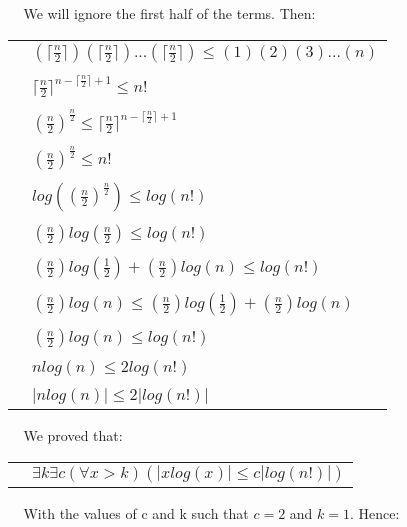\documentclass[11pt]{article}
\begin{document}
    \begin{flushleft}
        $\>\>\>\>\>$We will ignore the first half of the terms. Then: \\ 
    \end{flushleft}
    \begin{tabular}{l l}
        & $(\lceil \frac{n}{2} \rceil)(\lceil \frac{n}{2} \rceil)...(\lceil \frac{n}{2} \rceil) \leq (1)(2)(3)...(n)$ \\
        & \\
        & $\lceil \frac{n}{2} \rceil^{n-\lceil \frac{n}{2} \rceil+1} \leq n!$ \\
        & \\
        & $(\frac{n}{2})^{\frac{n}{2}} \leq \lceil \frac{n}{2} \rceil^{n-\lceil \frac{n}{2} \rceil+1}$ \\
        & \\
        & $(\frac{n}{2})^{\frac{n}{2}} \leq n!$ \\
        & \\
        & $log((\frac{n}{2})^{\frac{n}{2}}) \leq log(n!)$\\
        & \\
        & $(\frac{n}{2})log(\frac{n}{2}) \leq log(n!)$\\
        & \\
        & $(\frac{n}{2})log(\frac{1}{2}) + (\frac{n}{2})log(n) \leq log(n!)$\\
        & \\
        & $(\frac{n}{2})log(n) \leq (\frac{n}{2})log(\frac{1}{2}) + (\frac{n}{2})log(n)$\\
        & \\
        & $(\frac{n}{2})log(n) \leq log(n!)$\\
        & \\
        & $nlog(n) \leq 2log(n!)$\\
        & \\
        & $|nlog(n)| \leq 2|log(n!)|$\\
    \end{tabular}
    \begin{flushleft}
        $\>\>\>\>\>$We proved that: \\
    \end{flushleft}
    \begin{tabular}{l l}
        & $\exists k \exists c (\forall x > k)(|xlog(x)| \leq c|log(n!)|)$ \\
    \end{tabular}
    \begin{flushleft}
        $\>\>\>\>\>$With the values of c and k such that $c=2$ and $k=1$. Hence:\\
    \end{flushleft}
\end{document}
